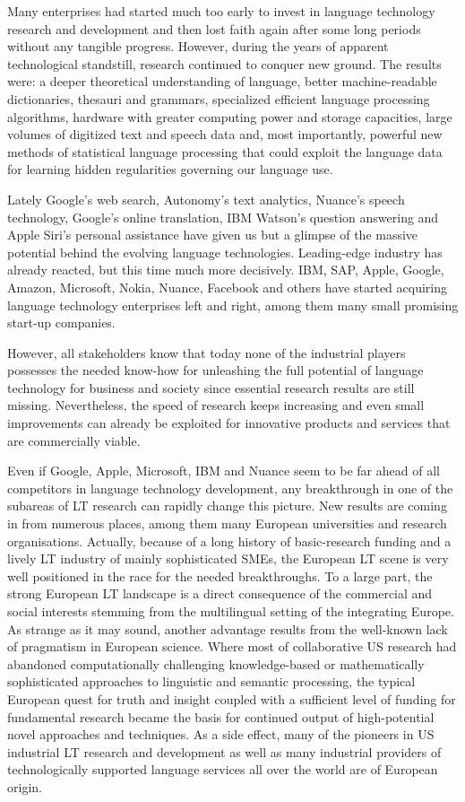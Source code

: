\documentclass[10pt, plain]{../../metanetpaper}
\begin{document}
\begin{multicols}{2}
Many enterprises had started much too early to invest in language technology research and development and then lost faith again after some long periods without any tangible progress. However, during the years of apparent technological standstill, research continued to conquer new ground. The results were: a deeper theoretical understanding of language, better machine-readable dictionaries, thesauri and grammars, specialized efficient language processing algorithms, hardware with greater computing power and storage capacities, large volumes of digitized text and speech data and, most importantly, powerful new methods of statistical language processing that could exploit the language data for learning hidden regularities governing our language use.

Lately Google’s web search, Autonomy’s text analytics, Nuance’s speech technology, Google’s online translation, IBM Watson’s question answering and Apple Siri’s personal assistance have given us but a glimpse of the massive potential behind the evolving language technologies. Leading-edge industry has already reacted, but this time much more decisively. IBM, SAP, Apple, Google, Amazon, Microsoft, Nokia, Nuance, Facebook and others have started acquiring language technology enterprises left and right, among them many small promising start-up companies.  

However, all stakeholders know that today none of the industrial players possesses the needed know-how for unleashing the full potential of language technology for business and society since essential research results are still missing. Nevertheless, the speed of research keeps increasing and even small improvements can already be exploited for innovative products and services that are commercially viable.

Even if Google, Apple, Microsoft, IBM and Nuance seem to be far ahead of all competitors in language technology development, any breakthrough in one of the subareas of LT research can rapidly change this picture. New results are coming in from numerous places, among them many European universities and research organisations. Actually, because of a long history of basic-research funding and a lively LT industry of mainly sophisticated SMEs, the European LT scene is very well positioned in the race for the needed breakthroughs. To a large part, the strong European LT landscape is a direct consequence of the commercial and social interests stemming from the multilingual setting of the integrating Europe. As strange as it may sound, another advantage results from the well-known lack of pragmatism in European science. Where most of collaborative US research had abandoned computationally challenging knowledge-based or mathematically sophisticated approaches to linguistic and semantic processing, the typical European quest for truth and insight coupled with a sufficient level of funding for fundamental research became the basis for continued output of high-potential novel approaches and techniques. As a side effect, many of the pioneers in US industrial LT research and development as well as many industrial providers of technologically supported language services all over the world are of European origin.  


\end{multicols}
\end{document}
